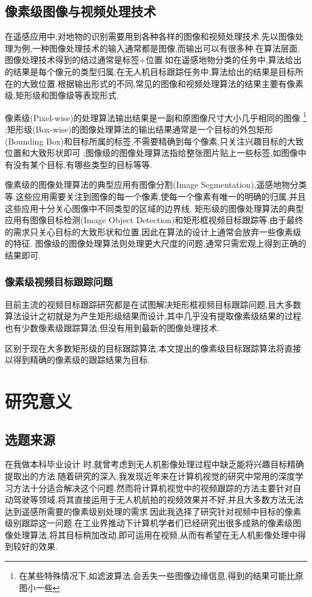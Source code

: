 \subsection{像素级图像与视频处理技术}
在遥感应用中,对地物的识别需要用到各种各样的图像和视频处理技术.先以图像处理为例,一种图像处理技术的输入通常都是图像,而输出可以有很多种.在算法层面,图像处理技术得到的结过通常是标签+位置.如在遥感地物分类的任务中,算法给出的结果是每个像元的类型归属;在无人机目标跟踪任务中,算法给出的结果是目标所在的大致位置.根据输出形式的不同,常见的图像和视频处理算法的结果主要有像素级,矩形级和图像级等表现形式.
\par
像素级(Pixel-wise)的处理算法输出结果是一副和原图像尺寸大小几乎相同的图像
\footnote{在某些特殊情况下,如滤波算法,会丢失一些图像边缘信息,得到的结果可能比原图小一些}
;矩形级(Box-wise)的图像处理算法的输出结果通常是一个目标的外包矩形(Bounding Box)和目标所属的标签,不需要精确到每个像素,只关注兴趣目标的大致位置和大致形状即可
;图像级的图像处理算法指给整张图片贴上一些标签,如图像中有没有某个目标,有哪些类型的目标等等.
\par
像素级的图像处理算法的典型应用有图像分割(Image Segmentation),遥感地物分类等.这些应用需要关注到图像的每一个像素,使每一个像素有唯一的明确的归属,并且这些应用十分关心图像中不同类型的区域的边界线.
矩形级的图像处理算法的典型应用有图像目标检测(Image Object Detection)和矩形框视频目标跟踪等.由于最终的需求只关心目标的大致形状和位置,因此在算法的设计上通常会放弃一些像素级的特征.
图像级的图像处理算法则处理更大尺度的问题.通常只需宏观上得到正确的结果即可.

\subsubsection{像素级视频目标跟踪问题}
目前主流的视频目标跟踪研究都是在试图解决矩形框视频目标跟踪问题,且大多数算法设计之初就是为产生矩形级结果而设计,其中几乎没有提取像素级结果的过程.也有少数像素级跟踪算法,但没有用到最新的图像处理技术.
\par
区别于现在大多数矩形级的目标跟踪算法,本文提出的像素级目标跟踪算法将直接以得到精确的像素级的跟踪结果为目标.

\section{研究意义}
\subsection{选题来源}
在我做本科毕业设计
\supercite{benchme}
时,就曾考虑到无人机影像处理过程中缺乏能将兴趣目标精确提取出的方法.随着研究的深入,我发现近年来在计算机视觉的研究中常用的深度学习方法十分适合解决这个问题.然而将计算机视觉中的视频跟踪的方法主要针对自动驾驶等领域,将其直接运用于无人机航拍的视频效果并不好,并且大多数方法无法达到遥感所需要的像素级别处理的需求.因此我选择了研究针对视频中目标的像素级别跟踪这一问题.在工业界推动下计算机学者们已经研究出很多成熟的像素级图像处理算法,将其目标稍加改动,即可运用在视频,从而有希望在无人机影像处理中得到较好的效果.

